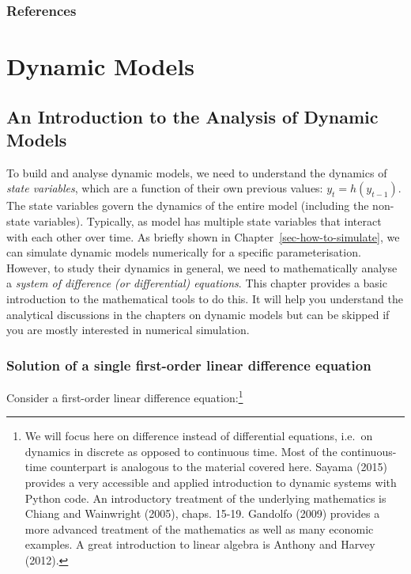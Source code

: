 \documentclass[
  letterpaper,
  DIV=11,
  numbers=noendperiod]{scrreprt}
\begin{document}
\section*{References}\label{references-6}


\part{Dynamic Models}

\chapter{An Introduction to the Analysis of Dynamic
Models}\label{sec-stab_analysis}

To build and analyse dynamic models, we need to understand the dynamics
of \emph{state variables}, which are a function of their own previous
values: \(y_t=h(y_{t-1})\). The state variables govern the dynamics of
the entire model (including the non-state variables). Typically, as
model has multiple state variables that interact with each other over
time. As briefly shown in Chapter~\ref{sec-how-to-simulate}, we can
simulate dynamic models numerically for a specific parameterisation.
However, to study their dynamics in general, we need to mathematically
analyse a \emph{system of difference (or differential) equations}. This
chapter provides a basic introduction to the mathematical tools to do
this. It will help you understand the analytical discussions in the
chapters on dynamic models but can be skipped if you are mostly
interested in numerical simulation.

\section{Solution of a single first-order linear difference
equation}\label{solution-of-a-single-first-order-linear-difference-equation}

Consider a first-order linear difference equation:\footnote{We will
  focus here on difference instead of differential equations, i.e.~on
  dynamics in discrete as opposed to continuous time. Most of the
  continuous-time counterpart is analogous to the material covered here.
  Sayama (2015) provides a very accessible and applied introduction to
  dynamic systems with Python code. An introductory treatment of the
  underlying mathematics is Chiang and Wainwright (2005), chaps. 15-19.
  Gandolfo (2009) provides a more advanced treatment of the mathematics
  as well as many economic examples. A great introduction to linear
  algebra is Anthony and Harvey (2012).}
\end{document}

